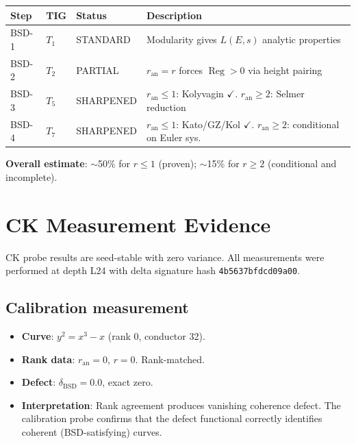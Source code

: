 \documentclass[11pt]{article}
\DeclareMathOperator{\Reg}{Reg}
\begin{document}
\begin{center}
\begin{tabular}{lllp{5.5cm}}
\hline
\textbf{Step} & \textbf{TIG} & \textbf{Status} & \textbf{Description} \\
\hline
BSD-1 & $T_1$ & STANDARD & Modularity gives $L(E,s)$ analytic properties \\
BSD-2 & $T_2$ & PARTIAL  & $r_{\mathrm{an}} = r$ forces $\Reg > 0$ via height pairing \\
BSD-3 & $T_5$ & SHARPENED & $r_{\mathrm{an}} \leq 1$: Kolyvagin $\checkmark$. $r_{\mathrm{an}} \geq 2$: Selmer reduction \\
BSD-4 & $T_7$ & SHARPENED & $r_{\mathrm{an}} \leq 1$: Kato/GZ/Kol $\checkmark$. $r_{\mathrm{an}} \geq 2$: conditional on Euler sys. \\
\hline
\end{tabular}
\end{center}

\medskip
\noindent
\textbf{Overall estimate}: $\sim$50\% for $r \leq 1$ (proven); $\sim$15\%
for $r \geq 2$ (conditional and incomplete).

\section{CK Measurement Evidence}
\label{sec:ck-evidence}

CK probe results are seed-stable with zero variance.  All measurements were
performed at depth L24 with delta signature hash \texttt{4b5637bfdcd09a00}.

\subsection{Calibration measurement}

\begin{itemize}
  \item \textbf{Curve}: $y^2 = x^3 - x$ (rank 0, conductor 32).
  \item \textbf{Rank data}: $r_{\mathrm{an}} = 0$, $r = 0$.  Rank-matched.
  \item \textbf{Defect}: $\delta_{\mathrm{BSD}} = 0.0$, exact zero.
  \item \textbf{Interpretation}: Rank agreement produces vanishing coherence
    defect.  The calibration probe confirms that the defect functional correctly
    identifies coherent (BSD-satisfying) curves.
\end{itemize}
\end{document}
